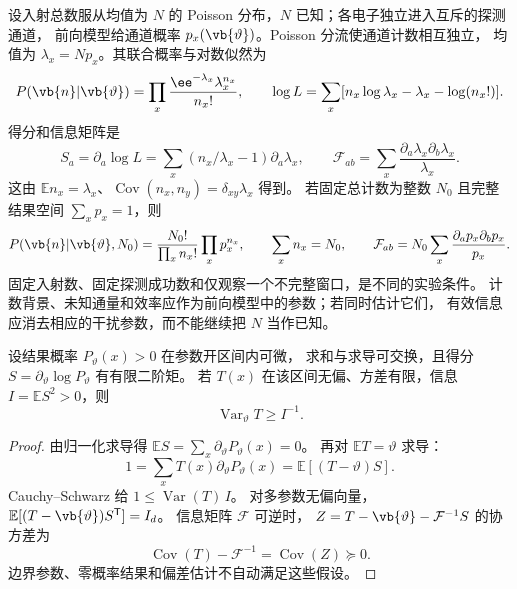 \begin{definition}
设入射总数服从均值为 $N$ 的 Poisson 分布，$N$ 已知；各电子独立进入互斥的探测通道，
前向模型给通道概率 $p_x(\vb{\vartheta})$。Poisson 分流使通道计数相互独立，
均值为 $\lambda_x=Np_x$。其联合概率与对数似然为
\begin{equation}
 P(\vb{n}|\vb{\vartheta})=\prod_x\frac{\ee^{-\lambda_x}\lambda_x^{n_x}}{n_x!},\qquad
 \log L=\sum_x[n_x\log\lambda_x-\lambda_x-\log(n_x!)].
 \label{eq:feqo-count-likelihood}
\end{equation}
得分和信息矩阵是
\begin{equation}
 S_a=\partial_a\log L=\sum_x(n_x/\lambda_x-1)\partial_a\lambda_x,
 \qquad\mathcal F_{ab}=\sum_x\frac{\partial_a\lambda_x\partial_b\lambda_x}{\lambda_x}.
 \label{eq:feqo-poisson-fisher}
\end{equation}
这由 $\mathbb E n_x=\lambda_x$、$\operatorname{Cov}(n_x,n_y)=\delta_{xy}\lambda_x$ 得到。
若固定总计数为整数 $N_0$ 且完整结果空间 $\sum_xp_x=1$，则
\begin{equation}
 P(\vb{n}|\vb{\vartheta},N_0)=\frac{N_0!}{\prod_xn_x!}\prod_xp_x^{n_x},\qquad
 \sum_xn_x=N_0,\qquad
 \mathcal F_{ab}=N_0\sum_x\frac{\partial_ap_x\partial_bp_x}{p_x}.
 \label{eq:feqo-multinomial}
\end{equation}
固定入射数、固定探测成功数和仅观察一个不完整窗口，是不同的实验条件。
计数背景、未知通量和效率应作为前向模型中的参数；若同时估计它们，
有效信息应消去相应的干扰参数，而不能继续把 $N$ 当作已知。
\end{definition}

\begin{proposition}
\label{prop:cramer-rao}
设结果概率 $P_\vartheta(x)>0$ 在参数开区间内可微，
求和与求导可交换，且得分 $S=\partial_\vartheta\log P_\vartheta$ 有有限二阶矩。
若 $T(x)$ 在该区间无偏、方差有限，信息 $I=\mathbb E S^2>0$，则
\begin{equation}
\operatorname{Var}_\vartheta T\ge I^{-1}.
\label{eq:feqo-cr-bound}
\end{equation}
\end{proposition}
\begin{proof}
由归一化求导得 $\mathbb ES=\sum_x\partial_\vartheta P_\vartheta(x)=0$。
再对 $\mathbb ET=\vartheta$ 求导：
\[
1=\sum_x T(x)\partial_\vartheta P_\vartheta(x)
=\mathbb E[(T-\vartheta)S].
\]
Cauchy--Schwarz 给 $1\le\operatorname{Var}(T)\,I$。
对多参数无偏向量，$\mathbb E[(T-\vb{\vartheta})S^{\mathsf T}]=I_d$。
信息矩阵 $\mathcal F$ 可逆时，
$Z=T-\vb{\vartheta}-\mathcal F^{-1}S$ 的协方差为
\begin{equation}
\operatorname{Cov}(T)-\mathcal F^{-1}=\operatorname{Cov}(Z)\succeq0.
\label{eq:feqo-cr-matrix}
\end{equation}
边界参数、零概率结果和偏差估计不自动满足这些假设。
\end{proof}

